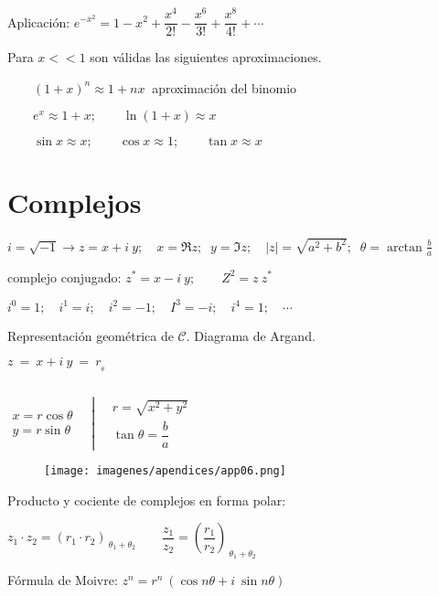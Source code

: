 Aplicación: $e^{-x^2}=1-x^2+\dfrac {x^4}{2!}-\dfrac {x^6}{3!}+\dfrac {x^8}{4!}+\cdots$

\begin{miparrafodestacado}
Para $x<<1$ son válidas las siguientes aproximaciones.

$\qquad (1+x)^n \approx 1+nx \ $ aproximación del binomio	

$\qquad e^x\approx 1 + x; \qquad \ln(1+x)\approx x$

$\qquad \sin x \approx x; \qquad \cos x\approx 1;\qquad \tan x\approx x$
\end{miparrafodestacado}


\section{Complejos}

$i=\sqrt{-1} \to z=x+i \ y; \quad x=\Re z;\;\; y=\Im z; \quad |z|=\sqrt{a^2+b^2}; \;\; \theta=\arctan \frac b a$


complejo conjugado: $z^*=x-i\ y;\qquad Z^2=z\ z^*$

$i^0=1;\quad i^1=i;\quad i^2=-1;\quad I^3=-i;\quad i^4=1;\quad \cdots$

Representación geométrica de $\mathcal C$. Diagrama de Argand.

\begin{multicols}{2}
$z\ = \ x+i\ y\ = \ r_{_\theta}$

$\quad$

$\left.
 \begin{matrix} x=r \cos \theta \\ y= r \sin \theta \end{matrix}
\quad  \right. \left| \quad 
\begin{matrix} r=\sqrt{x^2+y^2} \\ \tan \theta =\dfrac b a  \end{matrix} 
\right.$
\begin{figure}[H]
\centering
\texttt{[image: imagenes/apendices/app06.png]}
\end{figure}
\end{multicols}


Producto y cociente de complejos en forma polar:

$z_1\cdot z_2={(r_1\cdot r_2)}_{\ \theta_1+\theta_2} \qquad \dfrac {z_1}{z_2}={\left( \dfrac {r_1}{r_2} \right)}_{\ \theta_1+\theta_2}$

Fórmula de Moivre: $z^n=r^n\ (\cos n \theta + i\ \sin n\theta)$

